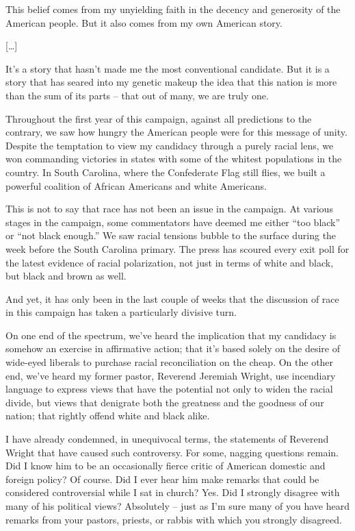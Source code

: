 \documentclass[10pt,a4paper]{article}
\begin{document}
This belief comes from my unyielding faith in the decency and generosity of the American people. But it also comes from my own American story. 

[…]

It’s a story that hasn’t made me the most conventional candidate. But it is a story that has seared into my genetic makeup the idea that this nation is more than the sum of its parts – that out of many, we are truly one. 

Throughout the first year of this campaign, against all predictions to the contrary, we saw how hungry the American people were for this message of unity. Despite the temptation to view my candidacy through a purely racial lens, we won commanding victories in states with some of the whitest populations in the country. In South Carolina, where the Confederate Flag still flies, we built a powerful coalition of African Americans and white Americans. 

This is not to say that race has not been an issue in the campaign. At various stages in the campaign, some commentators have deemed me either “too black” or “not black enough.” We saw racial tensions bubble to the surface during the week before the South Carolina primary. The press has scoured every exit poll for the latest evidence of racial polarization, not just in terms of white and black, but black and brown as well.

And yet, it has only been in the last couple of weeks that the discussion of race in this campaign has taken a particularly divisive turn. 

On one end of the spectrum, we’ve heard the implication that my candidacy is somehow an exercise in affirmative action; that it’s based solely on the desire of wide-eyed liberals to purchase racial reconciliation on the cheap. On the other end, we’ve heard my former pastor, Reverend Jeremiah Wright, use incendiary language to express views that have the potential not only to widen the racial divide, but views that denigrate both the greatness and the goodness of our nation; that rightly offend white and black alike. 

I have already condemned, in unequivocal terms, the statements of Reverend Wright that have caused such controversy. For some, nagging questions remain. Did I know him to be an occasionally fierce critic of American domestic and foreign policy? Of course. Did I ever hear him make remarks that could be considered controversial while I sat in church? Yes. Did I strongly disagree with many of his political views? Absolutely – just as I’m sure many of you have heard remarks from your pastors, priests, or rabbis with which you strongly disagreed. 
\end{document}
